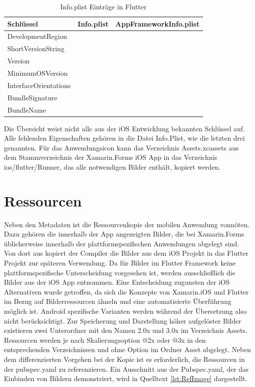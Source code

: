 \begin{table}[!ht]
  \begin{tabularx}{\linewidth}{|l|X|X|}
  \hline

  \textbf{Schlüssel}  &  \textbf{Info.plist} & \textbf{AppFrameworkInfo.plist} \\
\hline
  DevelopmentRegion  		&  					& 		\checkmark	 \\
  ShortVersionString  		&  					& 		\checkmark	 \\
  Version  							&  					& 		\checkmark	 \\
  MinimumOSVersion  		&  					& 		\checkmark	 \\
  
  InterfaceOrientations  		& \checkmark  	&		 					\\
  BundleSignature  			&  \checkmark 	& 							\\
  BundleName  					&  \checkmark 	& 		 					\\
  \hline
\end{tabularx}
\caption{Info.plist Einträge in Flutter}
 \label{tab:InfoPlist}
\end{table}
Die Übersicht weist nicht alle aus der iOS Entwicklung bekannten Schlüssel auf.  Alle fehlenden Eigenschaften gehören in die Datei Info.Plist,  wie die letzten drei genannten. 
Für das Anwendungsicon kann das Verzeichnis Assets.xcassets aus dem Stammverzeichnis der Xamarin.Forms iOS App in das Verzeichnis ios/flutter/Runner, das alle notwendigen Bilder enthält,  kopiert werden. 

\section{Ressourcen}

Neben den Metadaten ist die Ressourcenkopie der mobilen Anwendung vonnöten. 
Dazu gehören die innerhalb der App angezeigten Bilder, die bei Xamarin.Forms
üblicherweise innerhalb der plattformspezifischen Anwendungen abgelegt sind.
Von dort aus kopiert der Compiler die Bilder aus dem iOS Projekt in das Flutter Projekt zur späteren Verwendung.  Da für Bilder im Flutter Framework keine plattformspezifische Unterscheidung vorgesehen ist,  werden ausschließlich die Bilder aus der iOS App entnommen.  Eine Entscheidung zugunsten der iOS Alternativen wurde  getroffen,  da sich die Konzepte von Xamarin.iOS und Flutter im Bezug auf Bilderressourcen ähneln und eine automatisierte Überführung möglich ist.  Android spezifische Varianten werden während der Übersetzung also nicht berücksichtigt.   
Zur Speicherung und Darstellung höher aufgelöster Bilder existieren zwei Unterordner mit den Namen 2.0x und 3.0x im Verzeichnis Assets.  Ressourcen werden je nach Skalierungsoption @2x oder @3x in den entsprechenden Verzeichnissen und ohne Option im Ordner Asset abgelegt.
Neben dem differenzierten Vorgehen bei der Kopie ist es erforderlich,  die Ressourcen in der pubspec.yaml zu referenzieren.  Ein Ausschnitt aus der Pubspec.yaml,  der das Einbinden von Bildern demonstriert,  wird in Quelltext  \ref{lst:RefImage} dargestellt.

